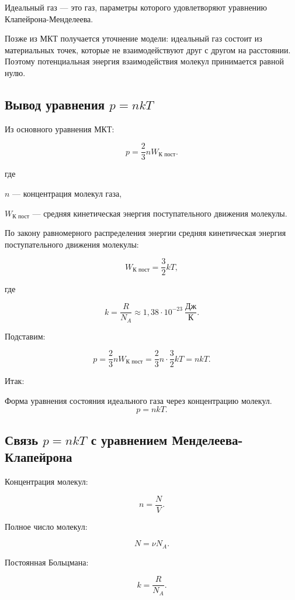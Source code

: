 \documentclass[a4paper,12pt]{article}
\begin{document}
\begin{definitionbox}
Идеальный газ — это газ, параметры которого удовлетворяют уравнению Клапейрона-Менделеева.
\end{definitionbox}

Позже из МКТ получается уточнение модели: идеальный газ состоит из материальных точек, которые не взаимодействуют друг с другом на расстоянии. Поэтому потенциальная энергия взаимодействия молекул принимается равной нулю.

\subsection*{Вывод уравнения $p=nkT$}

Из основного уравнения МКТ:

\[
p=\frac{2}{3}n W_{\text{К пост}}.
\]

где

$n$ — концентрация молекул газа,

$W_{\text{К пост}}$ — средняя кинетическая энергия поступательного движения молекулы.

По закону равномерного распределения энергии средняя кинетическая энергия поступательного движения молекулы:

\[
W_{\text{К пост}}=\frac{3}{2}kT,
\]

где

\[
k=\frac{R}{N_A}\approx1{,}38\cdot10^{-23}\ \frac{\text{Дж}}{\text{К}}.
\]

Подставим:

\[
p=\frac{2}{3}n W_{\text{К пост}}=\frac{2}{3}n\cdot\frac{3}{2}kT=nkT.
\]

Итак:

\begin{theorembox}
Форма уравнения состояния идеального газа через концентрацию молекул.
\[
p=nkT.
\]
\end{theorembox} 

\subsection*{Связь $p=nkT$ с уравнением Менделеева-Клапейрона}

Концентрация молекул:

\[
n=\frac{N}{V}.
\]

Полное число молекул:

\[
N=\nu N_A.
\]

Постоянная Больцмана:

\[
k=\frac{R}{N_A}.
\]
\end{document}
